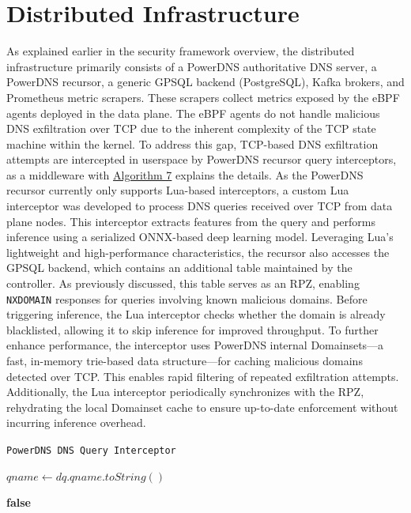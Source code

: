 \documentclass [11pt, proquest] {uwthesis}[2020/02/24]
\begin{document}
\section{Distributed Infrastructure }
As explained earlier in the security framework overview, the distributed infrastructure primarily consists of a PowerDNS authoritative DNS server, a PowerDNS recursor, a generic GPSQL backend (PostgreSQL), Kafka brokers, and Prometheus metric scrapers. These scrapers collect metrics exposed by the eBPF agents deployed in the data plane. The eBPF agents do not handle malicious DNS exfiltration over TCP due to the inherent complexity of the TCP state machine within the kernel. To address this gap, TCP-based DNS exfiltration attempts are intercepted in userspace by PowerDNS recursor query interceptors, as a middleware with \hyperref[sec:alg7]{Algorithm 7} explains the details. As the PowerDNS recursor currently only supports Lua-based interceptors, a custom Lua interceptor was developed to process DNS queries received over TCP from data plane nodes. This interceptor extracts features from the query and performs inference using a serialized ONNX-based deep learning model. Leveraging Lua’s lightweight and high-performance characteristics, the recursor also accesses the GPSQL backend, which contains an additional table maintained by the controller. As previously discussed, this table serves as an RPZ, enabling \texttt{NXDOMAIN} responses for queries involving known malicious domains. Before triggering inference, the Lua interceptor checks whether the domain is already blacklisted, allowing it to skip inference for improved throughput. To further enhance performance, the interceptor uses PowerDNS internal Domainsets—a fast, in-memory trie-based data structure—for caching malicious domains detected over TCP. This enables rapid filtering of repeated exfiltration attempts. Additionally, the Lua interceptor periodically synchronizes with the RPZ, rehydrating the local Domainset cache to ensure up-to-date enforcement without incurring inference overhead.

\begin{algorithm}[H]
\caption{\texttt{PowerDNS DNS Query Interceptor}}
\label{sec:alg7}
$qname \gets dq.qname.toString()$\;

\small %

\Return \textbf{false}\;
\end{algorithm}
\end{document}
